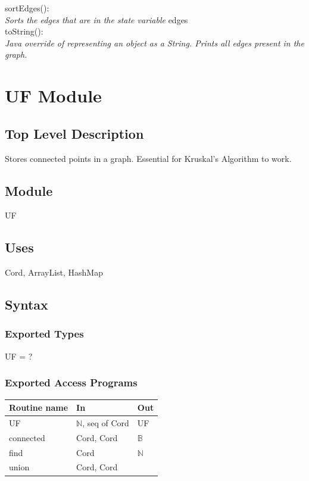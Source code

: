 \documentclass[12pt]{article}
\begin{document}
\noindent
sortEdges():\\
\textit{Sorts the edges that are in the state variable} edges\\


\noindent
toString():\\
\textit{Java override of representing an object as a String. Prints all edges
present in the graph.}


\newpage


\section*{UF Module}

\subsection* {Top Level Description}

Stores connected points in a graph. Essential for Kruskal's Algorithm to work.

\subsection*{Module}

UF

\subsection* {Uses}

Cord, ArrayList, HashMap

\subsection* {Syntax}

\subsubsection* {Exported Types}

UF = ?

\subsubsection* {Exported Access Programs}

\begin{tabular}{| l | l | l |}
\hline
\textbf{Routine name} & \textbf{In} & \textbf{Out}\\
\hline
UF & $\mathbb{N}$, seq of Cord & UF\\
\hline
connected & Cord, Cord & $\mathbb{B}$\\
\hline
find & Cord & $\mathbb{N}$\\
\hline
union & Cord, Cord & ~ \\
\hline
\end{tabular}
\end{document}
